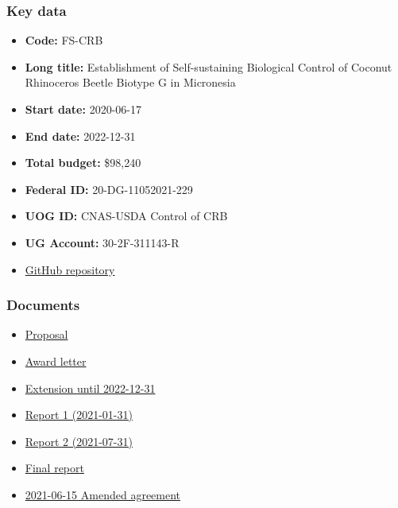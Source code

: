 \subsubsection{Key data}
\begin{itemize}
	\setlength\itemsep{0em}	
	\item \textbf{Code:} FS-CRB
	\item \textbf{Long title:} Establishment of Self-sustaining Biological Control of Coconut Rhinoceros Beetle Biotype G in Micronesia
	\item \textbf{Start date:} 2020-06-17
	\item \textbf{End date:} 2022-12-31
	\item \textbf{Total budget:} \$98,240
	\item \textbf{Federal ID:} 20-DG-11052021-229
	\item \textbf{UOG ID:} CNAS-USDA Control of CRB
	\item \textbf{UG Account:} 30-2F-311143-R
	\item \href{https://github.com/aubreymoore/2020-FS-CRB-biocontrol-project}{GitHub repository}
\end{itemize}

\subsubsection{Documents}
\begin{itemize}
	\setlength\itemsep{0em}	
	\item \href{https://github.com/aubreymoore/2020-FS-CRB-biocontrol-project/blob/master/combined-proposal.pdf}{Proposal}
	\item \href{https://github.com/aubreymoore/grant-tracker/blob/main/mydocs/20-DG-229\%20UOG\%20LFA\%20CRB\%20Fully\%20Signed\%20Grant.pdf}{Award letter}
	\item \href{https://github.com/aubreymoore/grant-tracker/blob/main/mydocs/20-DG-229\%20UOG\%20Mod\%201\%20Fully\%20Signed.pdf}{Extension until 2022-12-31}
	\item \href{https://github.com/aubreymoore/2020-FS-CRB-biocontrol-project/raw/master/FS-CRB-biocontrol-report1.pdf}{Report 1 (2021-01-31)}
	\item \href{}{Report 2 (2021-07-31)}
	\item \href{}{Final report}
	\item \href{https://github.com/aubreymoore/2020-FS-CRB-biocontrol-project/blob/master/20-DG-229-UOG-Mod-2-Fully-Signed.pdf}{2021-06-15 Amended agreement}
\end{itemize}


